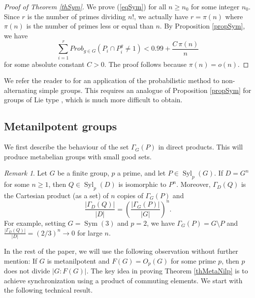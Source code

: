 \documentclass[11pt]{amsart}
\numberwithin{equation}{section}
\theoremstyle{definition}
\theoremstyle{remark}
\newtheorem{remark}[theorem]{Remark}
\newcommand{\Sym}{\mathop{\mathrm{Sym}}}
\newcommand{\Syl}{\mathop{\mathrm{Syl}}}
\begin{document}
\begin{proof}[Proof of Theorem \ref{thSym}]
We prove (\ref{eqSym}) for all $n \geq n_0$ for some integer $n_0$.
Since $r$ is the number of primes dividing $n!$, we actually have $r=\pi(n)$
where $\pi(n)$ is the number of primes less or equal than $n$.
By Proposition \ref{propSym}, we have
$$ \sum_{i=1}^r Prob_{g \in G}(P_i \cap P_i^g \neq 1) < 0.99 + \frac{C \, \pi(n)}{n} $$
for some absolute constant $C>0$.
The proof follows because $\pi(n) = o(n)$.
\end{proof}

We refer the reader to \cite{BH25} for an application of the probabilistic method to non-alternating simple groups.
This requires an analogue of Proposition \ref{propSym} for groups of Lie type \cite[Th. D]{BH25},
which is much more difficult to obtain.




\subsection{Metanilpotent groups} 

We first describe the behaviour of the set $\Gamma_G(P)$ in direct products.
This will produce metabelian groups with small good sets.

\begin{remark} \label{remSmallGS}
Let $G$ be a finite group, $p$ a prime, and let $P \in \Syl_p(G)$.
If $D=G^n$ for some $n \geq 1$, then $Q \in \Syl_p(D)$ is isomorphic to $P^n$.
Moreover, $\Gamma_D(Q)$ is the Cartesian product (as a set) of $n$ copies of $\Gamma_G(P)$ and
$$ \frac{|\Gamma_D(Q)|}{|D|} = \left( \frac{|\Gamma_G(P)|}{|G|} \right)^n . $$
For example, setting $G=\Sym(3)$ and $p=2$,
we have $\Gamma_G(P) = G \setminus P$
and $\frac{|\Gamma_D(Q)|}{|D|} = (2/3)^n \to 0$ for large $n$.
\end{remark}

In the rest of the paper, we will use the following observation without further mention:
If $G$ is metanilpotent and $F(G)=O_p(G)$ for some prime $p$,
then $p$ does not divide $|G:F(G)|$.
The key idea in proving Theorem \ref{thMetaNilp} is to achieve synchronization using a product of commuting elements.
We start with the following technical result.
\end{document}
